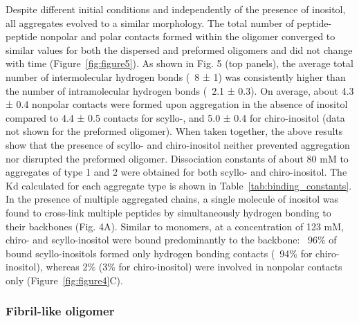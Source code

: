 Despite different initial conditions and independently of the presence of inositol, all aggregates evolved to a similar morphology. The total number of peptide-peptide nonpolar and polar contacts formed within the oligomer converged to similar values for both the dispersed and preformed oligomers and did not change with time (Figure~\ref{fig:figure5}). As shown in Fig. 5 (top panels), the average total number of intermolecular hydrogen bonds (~8 ± 1) was consistently \bbridge higher than the number of intramolecular hydrogen bonds (~2.1 ± 0.3). On average, about 4.3 ± 0.4 nonpolar contacts were formed upon aggregation in the absence of inositol compared to 4.4 ± 0.5 contacts for scyllo-, and 5.0 ± 0.4 for chiro-inositol (data not shown for the preformed oligomer). When taken together, the above results show that the presence of scyllo- and chiro-inositol neither prevented aggregation nor disrupted the preformed oligomer.
	 Dissociation constants of about 80 mM to aggregates of type 1 and 2 were obtained for both scyllo- and chiro-inositol. The Kd calculated for each aggregate type is shown in Table~\ref{tab:binding_constants}. In the presence of multiple aggregated chains, a single molecule of inositol was found to cross-link multiple peptides by simultaneously hydrogen bonding to their backbones (Fig. 4A). Similar to monomers, at a concentration of 123 mM, chiro- and scyllo-inositol were bound predominantly to the backbone: ~96\% of bound scyllo-inositols formed only hydrogen bonding contacts (~94\% for chiro-inositol), whereas 2\% (3\% for chiro-inositol) were involved in nonpolar contacts only (Figure~\ref{fig:figure4}C).

\subsubsection{Fibril-like oligomer} %


